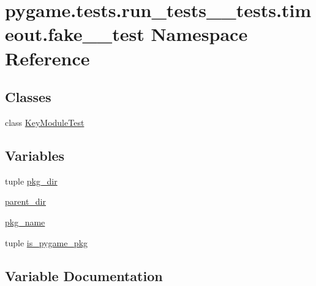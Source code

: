 \hypertarget{namespacepygame_1_1tests_1_1run__tests____tests_1_1timeout_1_1fake__2__test}{}\section{pygame.\+tests.\+run\+\_\+tests\+\_\+\+\_\+tests.\+timeout.\+fake\+\_\+\_\+test Namespace Reference}
\label{namespacepygame_1_1tests_1_1run__tests____tests_1_1timeout_1_1fake__2__test}
\subsection*{Classes}
\begin{DoxyCompactItemize}
\item 
class \hyperlink{classpygame_1_1tests_1_1run__tests____tests_1_1timeout_1_1fake__2__test_1_1_key_module_test}{Key\+Module\+Test}
\end{DoxyCompactItemize}
\subsection*{Variables}
\begin{DoxyCompactItemize}
\item 
tuple \hyperlink{namespacepygame_1_1tests_1_1run__tests____tests_1_1timeout_1_1fake__2__test_a9826c12da588a967d778da26f357c7e1}{pkg\+\_\+dir}
\item 
\hyperlink{namespacepygame_1_1tests_1_1run__tests____tests_1_1timeout_1_1fake__2__test_af3f2a064b4931fa9bc817b398fa11567}{parent\+\_\+dir}
\item 
\hyperlink{namespacepygame_1_1tests_1_1run__tests____tests_1_1timeout_1_1fake__2__test_aad8b5229665c1ece8fe5305d72763ff6}{pkg\+\_\+name}
\item 
tuple \hyperlink{namespacepygame_1_1tests_1_1run__tests____tests_1_1timeout_1_1fake__2__test_afa2800de8e2aec7503594dbdc9e11487}{is\+\_\+pygame\+\_\+pkg}
\end{DoxyCompactItemize}


\subsection{Variable Documentation}
\mbox{\label{namespacepygame_1_1tests_1_1run__tests____tests_1_1timeout_1_1fake__2__test_afa2800de8e2aec7503594dbdc9e11487}} 
